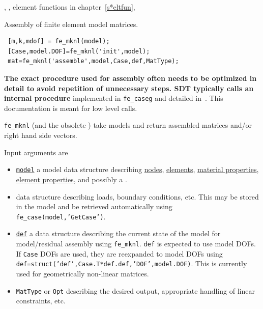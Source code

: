 
\noindent \melastic, \pshell, element functions in chapter~\ref{s*eltfun}, 


\noindent Assembly of finite element model matrices.

\rsyntax\begin{verbatim}
 [m,k,mdof] = fe_mknl(model);
 [Case,model.DOF]=fe_mknl('init',model); 
 mat=fe_mknl('assemble',model,Case,def,MatType);
\end{verbatim}


\begin{SDT}
 {\bf The exact procedure used for assembly often needs to be optimized in detail to avoid repetition of unnecessary steps. SDT typically calls an internal procedure} implemented in {\tt fe\_caseg}  and detailed in~. This documentation is meant for low level calls.
\end{SDT}


{\tt fe\_mknl} (and the obsolete \femk) take models and return assembled matrices and/or right hand side vectors. 

Input arguments are

\begin{itemize}

\item \hyperlink{model}{{\tt model}} a model data structure describing \hyperlink{node}{nodes}, \hyperlink{elt}{elements}, \hyperlink{pl}{material properties}, \hyperlink{il}{element properties}, and possibly a .

\item {} data structure describing loads, boundary conditions, etc. This may be stored in the model and be retrieved automatically using {\tt fe\_case(model,'GetCase')}. 

\item \hyperlink{def}{{\tt def}} a data structure describing the current state of the model for model/residual assembly using {\tt fe\_mknl}. {\tt def} is expected to use model DOFs. If {\tt Case} DOFs are used, they are reexpanded to model DOFs using {\tt def=struct('def',Case.T*def.def,'DOF',model.DOF)}. This is currently used for geometrically non-linear matrices.

\item {\tt MatType} or {\tt Opt} describing the desired output, appropriate handling of linear constraints, etc. 

\end{itemize}

